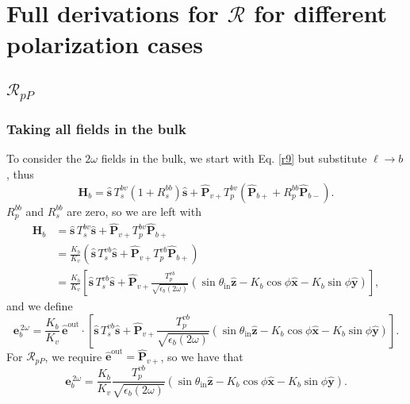 \section{Full derivations for \texorpdfstring{$\mathcal{R}$}{R} for different
polarization cases}

\subsection{\texorpdfstring{$\mathcal{R}_{pP}$}{RpP}}


\subsubsection{Taking all fields in the bulk}

To consider the $2\omega$ fields in the bulk, we start with Eq. \eqref{r9} but
substitute $\ell\rightarrow b$, thus
\begin{equation*}
\mathbf{H}_{b}
= \hat{\mathbf{s}}\,T_s^{b v}\left(1+R_{s}^{b b}\right)\hat{\mathbf{s}}
+ \hat{\mathbf{P}}_{v+}T_{p}^{b v}
\left(
\hat{\mathbf{P}}_{b+} + R_{p}^{b b}\hat{\mathbf{P}}_{b-}
\right).
\end{equation*}
$R_{p}^{b b}$ and $R_{s}^{b b}$ are zero, so we are left with
\begin{equation*}
\begin{split}
\mathbf{H}_{b}
&= \hat{\mathbf{s}}\,T_s^{b v}\hat{\mathbf{s}}
 + \hat{\mathbf{P}}_{v+}T_{p}^{b v}\hat{\mathbf{P}}_{b+}\\
&= \frac{K_{b}}{K_{v}}\left(\hat{\mathbf{s}}\,T_s^{vb}\hat{\mathbf{s}}
 + \hat{\mathbf{P}}_{v+}T_{p}^{vb}\hat{\mathbf{P}}_{b+}\right)\\
&= \frac{K_{b}}{K_{v}}
   \left[
   \hat{\mathbf{s}}\,T_s^{vb}\hat{\mathbf{s}}
 + \hat{\mathbf{P}}_{v+}
   \frac{T_{p}^{vb}}{\sqrt{\epsilon_{b}(2\omega)}}
   (\sin\theta_{\mathrm{in}}\hat{\mathbf{z}}
 - K_{b}\cos\phi\hat{\mathbf{x}} 
 - K_{b}\sin\phi\hat{\mathbf{y}})
   \right],
\end{split}
\end{equation*}
and we define
\begin{equation*}
\mathbf{e}^{\,2\omega}_{b}
= \frac{K_{b}}{K_{v}}\,\hat{\mathbf{e}}^{\mathrm{out}}\cdot
\left[
   \hat{\mathbf{s}}\,T_s^{vb}\hat{\mathbf{s}}
 + \hat{\mathbf{P}}_{v+}
   \frac{T_{p}^{vb}}{\sqrt{\epsilon_{b}(2\omega)}}
   (\sin\theta_{\mathrm{in}}\hat{\mathbf{z}}
 - K_{b}\cos\phi\hat{\mathbf{x}} 
 - K_{b}\sin\phi\hat{\mathbf{y}})
   \right].
\end{equation*}
For $\mathcal{R}_{pP}$, we require
$\hat{\mathbf{e}}^{\mathrm{out}}=\hat{\mathbf{P}}_{v+}$, so we have that
\begin{equation*}
\mathbf{e}^{\,2\omega}_{b}
= \frac{K_{b}}{K_{v}}
  \frac{T_{p}^{vb}}{\sqrt{\epsilon_{b}(2\omega)}}
  (\sin\theta_{\mathrm{in}}\hat{\mathbf{z}}
- K_{b}\cos\phi\hat{\mathbf{x}} 
- K_{b}\sin\phi\hat{\mathbf{y}}).
\end{equation*}

